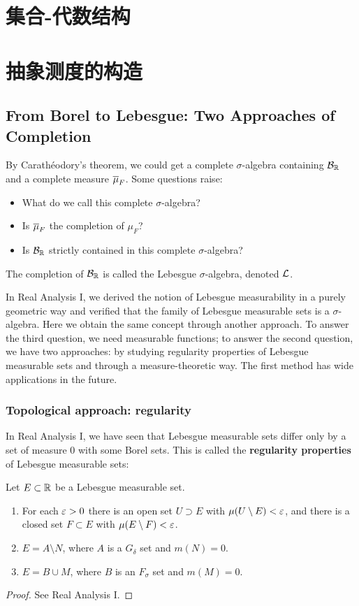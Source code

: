 \section{集合-代数结构}


\section{抽象测度的构造}

\subsection{From Borel to Lebesgue: Two Approaches of Completion}
By Carath\'eodory's theorem, we could get a complete $\sigma$-algebra containing $\mathcal{B}_{\mathbb{R}}$ and a complete measure $\overline{\mu}_F$. Some questions raise:
\begin{itemize}
    \item What do we call this complete $\sigma$-algebra?
    \item Is $\overline{\mu}_F$ the completion of $\mu_F$?
    \item Is $\mathcal{B}_{\mathbb{R}}$ strictly contained in this complete $\sigma$-algebra?
\end{itemize}
\begin{definition}
    The completion of $\mathcal{B}_{\mathbb{R}}$ is called the Lebesgue $\sigma$-algebra, denoted $\mathcal{L}$. 
\end{definition}
In Real Analysis I, we derived the notion of Lebesgue measurability in a purely geometric way and verified that the family of Lebesgue measurable sets is a $\sigma$-algebra. 
Here we obtain the same concept through another approach. 
To answer the third question, we need measurable functions; to answer the second question, we have two approaches: by studying regularity properties of Lebesgue measurable sets and through a measure-theoretic way. 
The first method has wide applications in the future. 
\subsubsection*{Topological approach: regularity}
In Real Analysis I, we have seen that Lebesgue measurable sets differ only by a set of measure $0$ with some Borel sets. This is called the \textbf{regularity properties} of Lebesgue measurable sets:
\begin{proposition}
    Let $E \subset \mathbb{R}$ be a Lebesgue measurable set. 
    \begin{enumerate}
    \item For each $\varepsilon>0$ there is an open set $U \supset E$ with $\mu(U \setminus E) < \varepsilon$, and there is a closed set $F \subset E$ with $\mu(E \setminus F) < \varepsilon$. 
    \item $E = A \setminus N$, where $A$ is a $G_\delta$ set and $m(N)=0$. 
    \item $E = B \cup M$, where $B$ is an $F_\sigma$ set and $m(M) = 0$. 
    \end{enumerate}
\end{proposition}
\begin{proof}
    See Real Analysis I. 
\end{proof}




